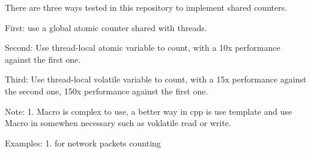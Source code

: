 There are three ways tested in this repository to implement shared counters.

First: use a global atomic counter shared with threads. 

Second: Use thread-local atomic variable to count, with a 10x performance against the first one.

Third: Use thread-local volatile variable to count, with a 15x performance against the second one, 150x performance against the first one.

Note:
1. Macro is complex to use, a better way in cpp is use template and use Macro in somewhen necessary such as voklatile read or write.

Examples:
1. for network packets counting
